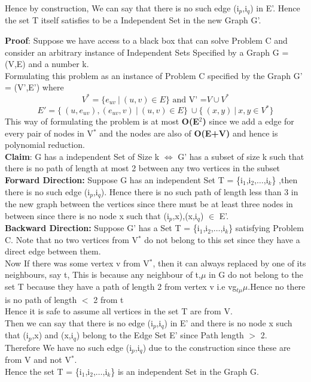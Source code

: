 \documentclass{report}
\begin{document}
 Hence by construction, We can say that there is no such edge (i$_p$,i$_q$) in E'. Hence the set T itself satisfies to be a Independent Set in the new Graph G'.
 \vspace*{1em}\\
 \textbf{Proof}: Suppose we have access to a black box that can solve Problem C and consider an arbitrary instance of Independent Sets Specified by a Graph G = (V,E) and a number k.\\
 Formulating this problem as an instance of Problem C specified by the Graph G' = (V',E') where
 \begin{equation*}
     V^* = \{ e_{uv} \ |\ (u,v) \in E \} \text{ and V' =} V \cup V^*
 \end{equation*}
 \begin{equation*}
     E' = \{\ (u,e_{uv}),(e_{uv},v) \ | \ (u,v) \in E \} \ \cup \{\ (x,y)\ | \ x,y \in V^* \}
 \end{equation*}
 This way of formulating the problem is at most \textbf{O(E$^2$)} since we add a edge for every pair of nodes in V$^*$ and the nodes are also of \textbf{O(E+V)} and hence is polynomial reduction.\\
 \textbf{Claim}: G has a independent Set of Size k  $\iff$  G' has a subset of size k such that there is no path of length at most 2 between any two vertices in the subset \vspace*{0.5em}\\
 \textbf{Forward Direction:} Suppose G has an independent Set T = \{i$_1$,i$_2$,$\dots$,i$_k$\} ,then there is no such edge (i$_p$,i$_q$). Hence there is no such path of length less than 3 in the new graph between the vertices since there must be at least three nodes in between since there is no node x such that (i$_p$,x),(x,i$_q$) $\in$ E'.\vspace*{0.2em}\\
 \textbf{Backward Direction:} Suppose G' has a Set T = \{i$_1$,i$_2$,$\dots$,i$_k$\} satisfying Problem C. Note that no two vertices from V$^*$ do not belong to this set since they have a direct edge between them.\\
 Now If there was some vertex v from V$^*$, then it can always replaced by one of its neighbours, say t, This is because any neighbour of t,$\mu$ in G do not belong to the set T because they have a path of length 2 from vertex v i.e vg$_{t\mu}\mu$.Hence no there is no path of length $<$ 2 from t \\
 Hence it is safe to assume all vertices in the set T are from V.\\
 Then we can say that there is no edge (i$_p$,i$_q$) in E' and there is no node x such that (i$_p$,x) and (x,i$_q$) belong to the Edge Set E' since Path length $>$ 2.\\
 Therefore We have no such edge (i$_p$,i$_q$) due to the construction since these are from V and not V$^*$.\\
 Hence the set T = \{i$_1$,i$_2$,$\dots$,i$_k$\} is an independent Set in the Graph G.
\end{document}
